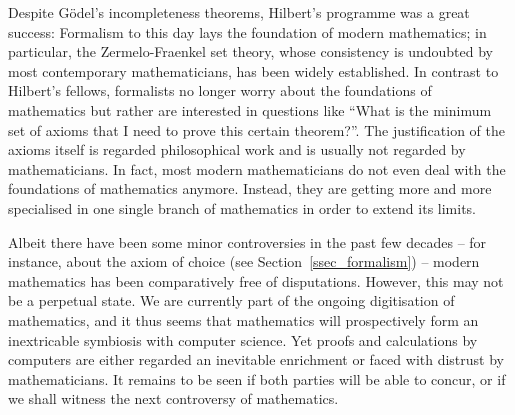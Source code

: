 \documentclass{article}
\begin{document}
Despite Gödel's incompleteness theorems, Hilbert's programme was a great success: Formalism to this day lays the foundation of modern mathematics; in particular, the Zermelo-Fraenkel set theory, whose consistency is undoubted by most contemporary mathematicians, has been widely established.
In contrast to Hilbert's fellows, formalists no longer worry about the foundations of mathematics but rather are interested in questions like ``What is the minimum set of axioms that I need to prove this certain theorem?''. The justification of the axioms itself is regarded philosophical work and is usually not regarded by mathematicians. In fact, most modern mathematicians do not even deal with the foundations of mathematics anymore. Instead, they are getting more and more specialised in one single branch of mathematics in order to extend its limits.

Albeit there have been some minor controversies in the past few decades -- for instance, about the axiom of choice (see Section~\ref{ssec_formalism}) -- modern mathematics has been comparatively free of disputations. However, this may not be a perpetual state. We are currently part of the ongoing digitisation of mathematics, and it thus seems that mathematics will prospectively form an inextricable symbiosis with computer science. Yet proofs and calculations by computers are either regarded an inevitable enrichment or faced with distrust by mathematicians. It remains to be seen if both parties will be able to concur, or if we shall witness the next controversy of mathematics.

\newpage
{}


\end{document}
